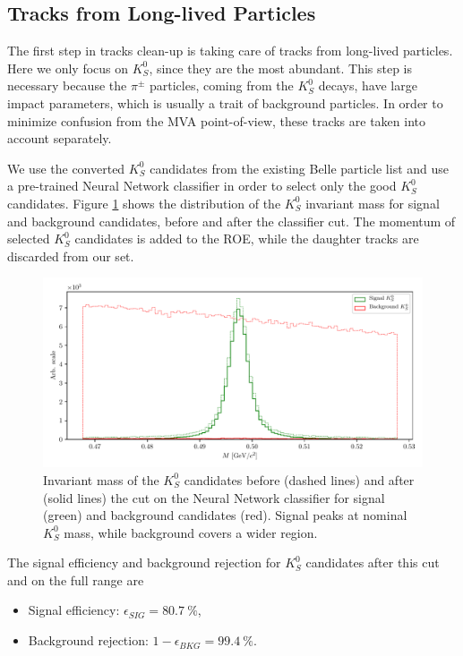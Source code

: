 \subsection{Tracks from Long-lived Particles}

The first step in tracks clean-up is taking care of tracks from long-lived particles. Here we only focus on $K_S^0$, since they are the most abundant. This step is necessary because the $\pi^\pm$ particles, coming from the $K_S^0$ decays, have large impact parameters, which is usually a trait of background particles. In order to minimize confusion from the MVA point-of-view, these tracks are taken into account separately.

We use the converted $K_S^0$ candidates from the existing Belle particle list and use a pre-trained Neural Network classifier in order to select only the good $K_S^0$ candidates. Figure \ref{fig:ROE_V0} shows the distribution of the $K_S^0$ invariant mass for signal and background candidates, before and after the classifier cut. The momentum of selected $K_S^0$ candidates is added to the ROE, while the daughter tracks are discarded from our set.

\begin{figure}[H]
	\centering
	\captionsetup{width=0.8\linewidth}
	\includegraphics[width=\linewidth]{fig/ROECleanup_V0}
	\caption{Invariant mass of the $K_S^0$ candidates before (dashed lines) and after (solid lines) the cut on the Neural Network classifier for signal (green) and background candidates (red). Signal peaks at nominal $K_S^0$ mass, while background covers a wider region.}
	\label{fig:ROE_V0}
\end{figure}

The signal efficiency and background rejection for $K_S^0$ candidates after this cut and on the full range are
\begin{itemize}
	\item Signal efficiency: $\epsilon_{SIG} = 80.7~\%$,
	\item Background rejection: $1-\epsilon_{BKG} = 99.4~\%$.
\end{itemize}

